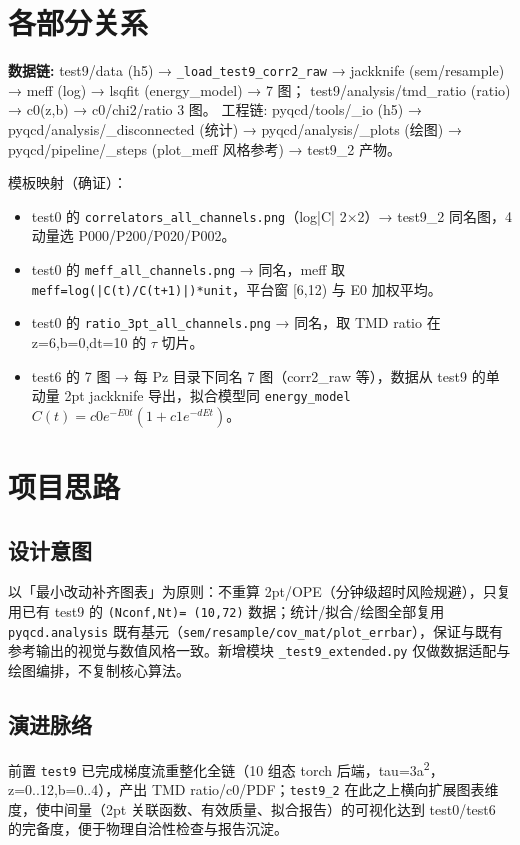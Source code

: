 \documentclass[UTF8]{ctexart}
\begin{document}
\section{各部分关系}
\begin{keybox}
\textbf{数据链:} \textcolor{relation}{test9/data (h5) → \nolinkurl{_load_test9_corr2_raw} → jackknife (sem/resample) → meff (log) → lsqfit (energy\_model) → 7 图；}
\textcolor{relation}{test9/analysis/tmd\_ratio (ratio) → c0(z,b) → c0/chi2/ratio 3 图。}
工程链: \textcolor{relation}{pyqcd/tools/\_io (h5) → pyqcd/analysis/\_disconnected (统计) → pyqcd/analysis/\_plots (绘图) → pyqcd/pipeline/\_steps (plot\_meff 风格参考) → test9\_2 产物。}
\end{keybox}

模板映射（确证）：
\begin{itemize}
\item test0 的 \texttt{correlators\_all\_channels.png}（log|C| 2×2）→ test9\_2 同名图，4 动量选 P000/P200/P020/P002。
\item test0 的 \texttt{\nolinkurl{meff\_all\_channels.png}} → 同名，meff 取 \texttt{meff=log(|C(t)/C(t+1)|)*unit}，平台窗 [6,12) 与 E0 加权平均。
\item test0 的 \texttt{\nolinkurl{ratio\_3pt\_all\_channels.png}} → 同名，取 TMD ratio 在 z=6,b=0,dt=10 的 $\tau$ 切片。
\item test6 的 7 图 → 每 Pz 目录下同名 7 图（corr2\_raw 等），数据从 test9 的单动量 2pt jackknife 导出，拟合模型同 \texttt{energy\_model} $C(t)=c0 e^{-E0 t}(1+c1 e^{-dE t})$。
\end{itemize}

\section{项目思路}
\subsection{设计意图}
以「最小改动补齐图表」为原则：不重算 2pt/OPE（分钟级超时风险规避），只复用已有 test9 的 \texttt{(Nconf,Nt)= (10,72)} 数据；统计/拟合/绘图全部复用 \texttt{pyqcd.analysis} 既有基元（\texttt{sem/resample/cov\_mat/plot\_errbar}），保证与既有参考输出的视觉与数值风格一致。新增模块 \texttt{\_test9\_extended.py} 仅做数据适配与绘图编排，不复制核心算法。

\subsection{演进脉络}
前置 \texttt{test9} 已完成梯度流重整化全链（10 组态 torch 后端，tau=3a\textsuperscript{2}，z=0..12,b=0..4），产出 TMD ratio/c0/PDF；\texttt{test9\_2} 在此之上横向扩展图表维度，使中间量（2pt 关联函数、有效质量、拟合报告）的可视化达到 test0/test6 的完备度，便于物理自洽性检查与报告沉淀。
\end{document}
